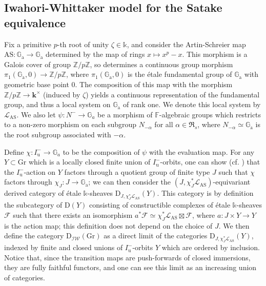 \documentclass[11pt]{amsart}
\theoremstyle{plain}
\theoremstyle{remark}
\numberwithin{equation}{section}
\begin{document}
 	
\subsection{Iwahori-Whittaker model for the Satake equivalence}\label{section Iwahori-Whittaker model for the Satake equivalence}
	Fix a primitive $p$-th root of unity $\zeta\in\mathbb{k}$, and consider the Artin-Schreier map $\mathrm{AS}:\mathbb{G}_\mathrm{a}\to \mathbb{G}_\mathrm{a}$ determined by the map of rings $x\mapsto x^p-x$. This morphism is a Galois cover of group $\mathbb{Z}/p\mathbb{Z}$, so determines a continuous group morphism $\pi_1(\mathbb{G}_\mathrm{a},0)\to \mathbb{Z}/p\mathbb{Z}$, where $\pi_1(\mathbb{G}_\mathrm{a},0)$ is the \'etale fundamental group of $\mathbb{G}_\mathrm{a}$ with geometric base point $0$. The composition of this map with the morphism $\mathbb{Z}/p\mathbb{Z}\to \mathbf{k}^\times$ (induced by $\zeta$) yields a continuous representation of the fundamental group, and thus a local system on $\mathbb{G}_\mathrm{a}$ of rank one. We denote this local system by $\mathcal{L}_{\mathrm{AS}}$. We also let $\psi:N^-\to\mathbb{G}_a$ be a morphism of $\mathbb{F}$-algebraic groups which restricts to a non-zero morphism on each subgroup $N_{-\alpha}$ for all $\alpha\in\mathfrak{R}_s$, where $N_{-\alpha}\simeq\mathbb{G}_\mathrm{a}$ is the root subgroup associated with $-\alpha$.
	
	Define $\chi:I_{\mathrm{u}}^-\to \mathbb{G}_a$ to be the composition of $\psi$ with the evaluation map. For any $Y\subset \mathrm{Gr}$ which is a locally closed finite union of $I_{\mathrm{u}}^-$-orbits, one can show (cf. \cite[Lemma 3.2]{ciappara2021hecke}) that the $I_{\mathrm{u}}^-$-action on $Y$ factors through a quotient group of finite type $J$ such that $\chi$ factors through $\chi_J:J\to \mathbb{G}_\mathrm{a}$; we can then consider the $(J,\chi_J^*\mathcal{L}_{\mathrm{AS}})$-equivariant derived category of \'etale $\mathbb{k}$-sheaves $\mathrm{D}_{J,\chi_J^*\mathcal{L}_{\mathrm{AS}}}(Y)$. This category is by definition the subcategory of $\mathrm{D}(Y)$ consisting of constructible complexes of \'etale $\mathbb{k}$-sheaves $\mathcal{F}$ such that there exists an isomorphism $a^*\mathcal{F}\simeq \chi_J^*\mathcal{L}_{\mathrm{AS}}\boxtimes\mathcal{F}$, where $a:J\times Y\to Y$ is the action map; this definition does not depend on the choice of $J$. We then define the category $\mathrm{D}_{\mathcal{IW}}(\mathrm{Gr})$ as a direct limit of the categories $\mathrm{D}_{J,\chi_J^*\mathcal{L}_{\mathrm{AS}}}(Y)$, indexed by finite and closed unions of $I^-_\mathrm{u}$-orbits $Y$ which are ordered by inclusion. Notice that, since the transition maps are push-forwards of closed immersions, they are fully faithful functors, and one can see this limit as an increasing union of categories.
	
\end{document}
